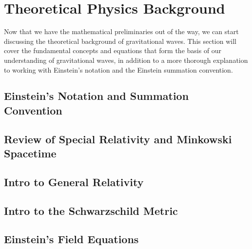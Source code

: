\section{Theoretical Physics Background}
\label{sec:theoretical_physics_background}

Now that we have the mathematical preliminaries out of the way, we can start discussing the theoretical background of gravitational waves. This section will cover the fundamental concepts and equations that form the basis of our understanding of gravitational waves, in addition to a more thorough explanation to working with Einstein's notation and the Einstein summation convention.

\subsection{Einstein's Notation and Summation Convention}

\subsection{Review of Special Relativity and Minkowski Spacetime}

\subsection{Intro to General Relativity}

\subsection{Intro to the Schwarzschild Metric}

\subsection{Einstein's Field Equations}
